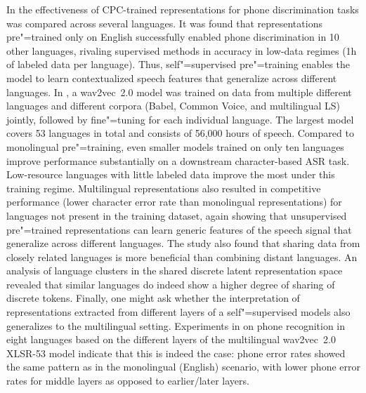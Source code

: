 In \parencite{riviere_unsupervised_2020} the effectiveness of CPC-trained representations for
phone discrimination tasks was compared across several languages. It
was found that representations pre"=trained only on English successfully
enabled phone discrimination in 10 other languages, rivaling
supervised methods in accuracy in low-data regimes (1h of labeled data
per language). Thus, self"=supervised pre"=training enables the model to
learn contextualized speech features that generalize across different
languages. In \parencite{conneau_unsupervised_2020}, a wav2vec~2.0 model was trained on data
from multiple different languages and different corpora (Babel, Common Voice,
and multilingual LS)
jointly, followed by fine"=tuning for each individual language. The largest
model covers 53 languages in total
and consists of 56,000 hours of speech. Compared to monolingual pre"=training,
even smaller models trained on only ten languages improve performance
substantially on a downstream character-based ASR task. Low-resource languages
with little labeled data improve the most under this training regime.
Multilingual representations also resulted in competitive performance (lower
character error rate than monolingual representations) for languages not
present in the training dataset, again showing that unsupervised pre"=trained
representations can learn generic features of the speech signal that generalize
across different languages. The study also found that sharing data from closely
related languages is more beneficial than combining distant languages. An
analysis of language clusters in the shared discrete latent representation
space revealed that similar languages do indeed show a higher degree of sharing
of discrete tokens. 
Finally, one might ask whether the interpretation of representations extracted
from different layers of a self"=supervised models also generalizes to the
multilingual setting. Experiments in \parencite{baevski_unsupervised_2021} on phone
recognition in eight languages based on the different layers of the
multilingual wav2vec~2.0 XLSR-53 model indicate that this is indeed the case:
phone error rates showed the same pattern as in the monolingual (English)
scenario, with lower phone error rates for middle layers as opposed to
earlier/later layers. 





